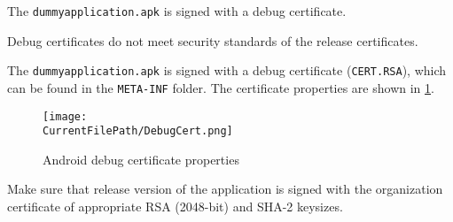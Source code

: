 %
%
%
%













The \texttt{dummyapplication.apk} is signed with a debug certificate.




Debug certificates do not meet security standards of the release certificates. 

\pagebreak


The \texttt{dummyapplication.apk} is signed with a debug certificate (\texttt{CERT.RSA}), which can be found in the \texttt{META-INF} folder.
The certificate properties are shown in \cref{figure:DebugCert}.

\begin{figure}[H]
\centering
\texttt{[image: \\CurrentFilePath/DebugCert.png]}
\caption{Android debug certificate properties}
\label{figure:DebugCert}
\end{figure}
	




Make sure that release version of the application is signed with the organization certificate of appropriate RSA (2048-bit)
and SHA-2 keysizes.

